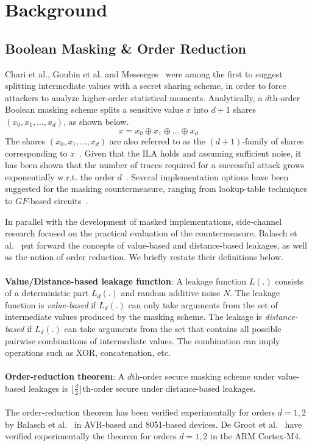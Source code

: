 \section{Background} \label{sec:background}
\subsection{Boolean Masking \& Order Reduction}
Chari et al., Goubin et al. and Messerges~\cite{DBLP:conf/crypto/ChariJRR99,DBLP:conf/ches/GoubinP99,DBLP:conf/fse/Messerges00} were among the first to suggest splitting intermediate
values with a secret sharing scheme, in order to force attackers to analyze higher-order statistical moments. Analytically, a $d$th-order Boolean masking scheme splits a sensitive value $x$ into $d+1$ shares $(x_0, x_1, \dots, x_d)$, as shown below.
\begin{equation}
x = x_0 \oplus  x_1 \oplus \dots \oplus x_d
\end{equation}
The shares $(x_0, x_1, \dots, x_d)$ are also referred to as the $(d+1)$-family of shares corresponding to $x$~\cite{DBLP:conf/ches/RivainP10}. Given that the ILA holds and assuming sufficient noise, it has been shown that the number of traces required for a successful attack grows exponentially w.r.t. the order $d$~\cite{DBLP:conf/crypto/ChariJRR99,DBLP:conf/eurocrypt/ProuffR13}. Several implementation options have been suggested for the masking countermeasure, ranging from lookup-table techniques~\cite{DBLP:conf/eurocrypt/Coron14,DBLP:conf/ctrsa/WangVGX15} to $GF$-based circuits~\cite{DBLP:conf/crypto/IshaiSW03,DBLP:journals/iacr/CanrightB09,DBLP:conf/ches/RivainP10,cryptoeprint:2016:264}.

In parallel with the development of masked implementations, side-channel research focused on the practical evaluation of the countermeasure. Balasch et al.~\cite{DBLP:conf/cardis/BalaschGGRS14} put forward the concepts of value-based and distance-based leakages, as well as the notion of order reduction. We briefly restate their definitions below.\\\\
\textbf{Value/Distance-based leakage function}: A leakage function $L(.)$ consists of a deterministic part $L_d(.)$ and random additive noise $N$. The leakage function is \emph{value-based} if $L_d(.)$ can only take arguments from the set of intermediate values produced by the masking scheme. The leakage is \emph{distance-based} if $L_d(.)$ can  take arguments from the set that contains all possible pairwise combinations of intermediate values. The combination can imply operations such as XOR, concatenation, etc.  \\\\
\textbf{Order-reduction theorem}: A $d$th-order secure masking scheme under value-based leakages is $\lfloor \frac{d}{2} \rfloor$th-order secure under distance-based leakages.\\\\
The order-reduction theorem has been verified experimentally for orders $d=1,2$ by Balasch et al.~\cite{DBLP:conf/cardis/BalaschGGRS14} in AVR-based and 8051-based devices. De Groot et al.~\cite{DBLP:journals/iacr/GrootPPSB16} have verified experimentally the theorem for orders $d=1,2$ in the ARM Cortex-M4.
